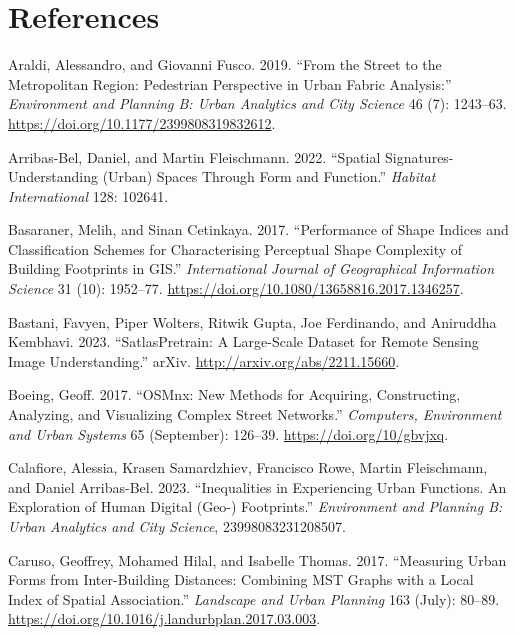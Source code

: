 \documentclass[
  letterpaper,
  DIV=11,
  numbers=noendperiod]{scrartcl}
\newlength{\cslhangindent}
\newenvironment{CSLReferences}[2] %
 {\begin{list}{}{%
  \setlength{\itemindent}{0pt}
  \setlength{\leftmargin}{0pt}
  \setlength{\parsep}{0pt}
  \ifodd #1
   \setlength{\leftmargin}{\cslhangindent}
   \setlength{\itemindent}{-1\cslhangindent}
  \fi
  \setlength{\itemsep}{#2\baselineskip}}}
 {\end{list}}
\begin{document}
\section*{References}\label{references}

\label{refs}
\begin{CSLReferences}{1}{0}
Araldi, Alessandro, and Giovanni Fusco. 2019. {``From the Street to the
Metropolitan Region: {Pedestrian} Perspective in Urban Fabric
Analysis:''} \emph{Environment and Planning B: Urban Analytics and City
Science} 46 (7): 1243--63.
\url{https://doi.org/10.1177/2399808319832612}.

Arribas-Bel, Daniel, and Martin Fleischmann. 2022. {``Spatial
Signatures-Understanding (Urban) Spaces Through Form and Function.''}
\emph{Habitat International} 128: 102641.

Basaraner, Melih, and Sinan Cetinkaya. 2017. {``Performance of Shape
Indices and Classification Schemes for Characterising Perceptual Shape
Complexity of Building Footprints in {GIS}.''} \emph{International
Journal of Geographical Information Science} 31 (10): 1952--77.
\url{https://doi.org/10.1080/13658816.2017.1346257}.

Bastani, Favyen, Piper Wolters, Ritwik Gupta, Joe Ferdinando, and
Aniruddha Kembhavi. 2023. {``{SatlasPretrain}: {A} {Large}-{Scale}
{Dataset} for {Remote} {Sensing} {Image} {Understanding}.''} arXiv.
\url{http://arxiv.org/abs/2211.15660}.

Boeing, Geoff. 2017. {``{OSMnx}: {New} Methods for Acquiring,
Constructing, Analyzing, and Visualizing Complex Street Networks.''}
\emph{Computers, Environment and Urban Systems} 65 (September): 126--39.
\url{https://doi.org/10/gbvjxq}.

Calafiore, Alessia, Krasen Samardzhiev, Francisco Rowe, Martin
Fleischmann, and Daniel Arribas-Bel. 2023. {``Inequalities in
Experiencing Urban Functions. An Exploration of Human Digital (Geo-)
Footprints.''} \emph{Environment and Planning B: Urban Analytics and
City Science}, 23998083231208507.

Caruso, Geoffrey, Mohamed Hilal, and Isabelle Thomas. 2017. {``Measuring
Urban Forms from Inter-Building Distances: {Combining MST} Graphs with a
{Local Index} of {Spatial Association}.''} \emph{Landscape and Urban
Planning} 163 (July): 80--89.
\url{https://doi.org/10.1016/j.landurbplan.2017.03.003}.


\end{CSLReferences}
\end{document}
